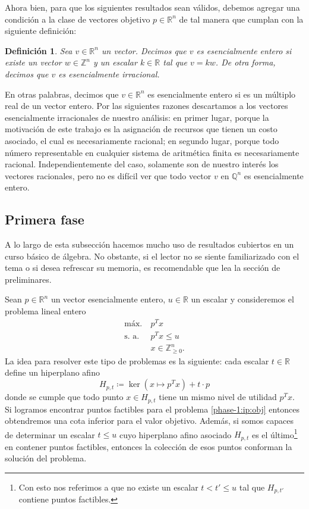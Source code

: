 \documentclass[11pt]{article}
\newtheorem{definition}{Definición}
\begin{document}
Ahora bien, para que los siguientes resultados sean válidos, debemos agregar una condición a la
clase de vectores objetivo $p \in \mathbb{R}^n$ de tal manera que cumplan con la siguiente
definición:
\begin{definition}
	Sea $v \in \mathbb{R}^n$ un vector. Decimos que $v$ es esencialmente entero si existe un vector
	$w \in \mathbb{Z}^n$ y un escalar $k \in \mathbb{R}$ tal que $v = kw$. De otra forma, decimos
	que $v$ es esencialmente irracional.
\end{definition}
En otras palabras, decimos que $v \in \mathbb{R}^n$ es esencialmente entero si es un múltiplo real
de un vector entero. Por las siguientes razones descartamos a los vectores esencialmente
irracionales de nuestro análisis: en primer lugar, porque la motivación de este trabajo es la
asignación de recursos que tienen un costo asociado, el cual es necesariamente racional; en segundo
lugar, porque todo número representable en cualquier sistema de aritmética finita es necesariamente
racional. Independientemente del caso, solamente son de nuestro interés los vectores racionales,
pero no es difícil ver que todo vector $v$ en $\mathbb{Q}^n$ es esencialmente entero.

\subsection*{Primera fase}
A lo largo de esta subsección hacemos mucho uso de resultados cubiertos en un curso básico de
álgebra. No obstante, si el lector no se siente familiarizado con el tema o si desea refrescar su
memoria, es recomendable que lea la sección de preliminares.

Sean $p \in \mathbb{R}^n$ un vector esencialmente entero, $u \in \mathbb{R}$ un escalar y
consideremos el problema lineal entero
\begin{align}
	\text{máx.} ~& p^Tx \label{phase-1:ip:obj} \\
	\text{s. a.} ~& p^Tx \leq u \label{phase-1:ip:prep} \\
				 & x \in \mathbb{Z}_{\geq 0}^n \label{phase-1:ip:non-negative}.
\end{align}
La idea para resolver este tipo de problemas es la siguiente: cada escalar $t \in \mathbb{R}$ define
un hiperplano afino
\begin{equation}
	\label{phase-1:hyper}
	H_{p, t} \coloneq \ker\left( x \mapsto p^Tx \right) + t \cdot p
\end{equation}
donde se cumple que todo punto $x \in H_{p, t}$ tiene un mismo nivel de utilidad $p^Tx$. Si logramos
encontrar puntos factibles para el problema \ref{phase-1:ip:obj} entonces obtendremos una
cota inferior para el valor objetivo. Además, si somos capaces de determinar un escalar $t \leq u$
cuyo hiperplano afino asociado $H_{p, t}$ es el último\footnote{Con esto nos referimos a que no
existe un escalar $t < t' \leq u$ tal que $H_{p, t'}$ contiene puntos factibles.} en contener puntos
factibles, entonces la colección de esos puntos conforman la solución del problema.
\end{document}
